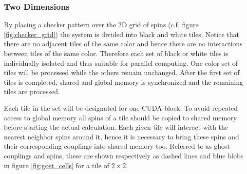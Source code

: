 \documentclass[paper=a4, fontsize=11pt]{scrartcl} %
\numberwithin{equation}{section} %
\numberwithin{figure}{section} %
\numberwithin{table}{section} %
\begin{document}
\subsubsection{Two Dimensions}
By placing a checker pattern over the 2D grid of spins (c.f. figure \ref{fig:checker_grid}) the system is divided into black and white tiles. Notice that there are no adjacent tiles of the same color and hence there are no interactions between tiles of the same color. Therefore each set of black or white tiles is individually isolated and thus suitable for parallel computing. One color set of tiles will be processed while the others remain unchanged. After the first set of tiles is completed, shared and global memory is synchronized and the remaining tiles are processed.

Each tile in the set will be designated for one CUDA block. To avoid repeated access to global memory all spins of a tile should be copied to shared memory before starting the actual calculation. Each given tile will interact with the nearest neighbor spins around it, hence it is necessary to bring these spins and their corresponding couplings into shared memory too. Referred to as ghost couplings and spins, these are shown respectively as dashed lines and blue blobs in figure \ref{fig:gost_cells} for a tile of $2\times2$.
\end{document}
